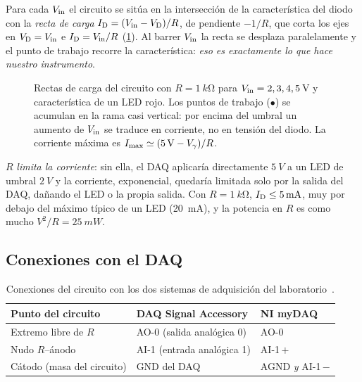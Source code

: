 \documentclass[11pt,a4paper]{article}
\begin{document}
Para cada $V_{\mathrm{in}}$ el circuito se sitúa en la intersección de la característica
del diodo con la \emph{recta de carga} $I_{\mathrm D}=(V_{\mathrm{in}}-V_{\mathrm D})/R$, de pendiente
$-1/R$, que corta los ejes en $V_{\mathrm D}=V_{\mathrm{in}}$ e $I_{\mathrm D}=V_{\mathrm{in}}/R$ (\cref{fig:recta}).
Al barrer $V_{\mathrm{in}}$ la recta se desplaza paralelamente y el punto de trabajo
recorre la característica: \emph{eso es exactamente lo que hace nuestro
instrumento}.

\begin{figure}[htbp]
  \centering
  
  \caption{Rectas de carga del circuito con $R=\SI{1}{k\ohm}$ para
  $V_{\mathrm{in}}=2,3,4,5$\,V y característica de un LED rojo. Los puntos de trabajo
  ($\bullet$) se acumulan en la rama casi vertical: por encima del umbral un
  aumento de $V_{\mathrm{in}}$ se traduce en corriente, no en tensión del diodo. La
  corriente máxima es $I_{\max}\simeq(\SI{5}{V}-V_{\gamma})/R$.}
  \label{fig:recta}
\end{figure}

\begin{observacion}[Papel de $R$]
  $R$ \emph{limita la corriente}: sin ella, el DAQ aplicaría directamente
  $\SI{5}{V}$ a un LED de umbral $\SI{2}{V}$ y la corriente, exponencial,
  quedaría limitada solo por la salida del DAQ, dañando el LED o la propia
  salida. Con $R=\SI{1}{k\ohm}$, $I_{\mathrm D}\le\SI{5}{mA}$, muy por debajo del
  máximo típico de un LED (\SI{20}{mA}), y la potencia en $R$ es como mucho
  $V^2/R=\SI{25}{mW}$.
\end{observacion}

\subsection{Conexiones con el DAQ}

\begin{table}[htbp]
  \centering\small
  \caption{Conexiones del circuito con los dos sistemas de adquisición del
  laboratorio~\cite{guion,mydaq}.}
  \label{tab:conexiones}
  \renewcommand{\arraystretch}{1.25}
  \begin{tabularx}{\linewidth}{@{}l X X@{}}
    \toprule
    \textbf{Punto del circuito} & \textbf{DAQ Signal Accessory} & \textbf{NI myDAQ}\\
    \midrule
    Extremo libre de $R$ & AO-0 (salida analógica 0) & AO-0\\
    Nudo $R$--ánodo & AI-1 (entrada analógica 1) & AI-1\,$+$\\
    Cátodo (masa del circuito) & GND del DAQ & AGND \emph{y} AI-1\,$-$\\
    \bottomrule
  \end{tabularx}
\end{table}
\end{document}
